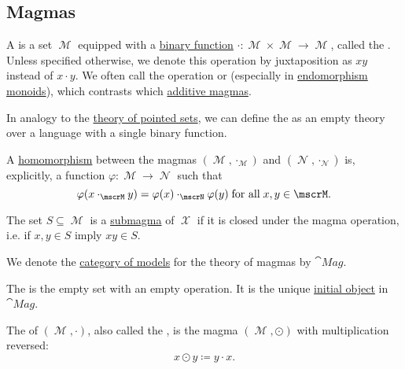 \subsection{Magmas}\label{subsec:magmas}

\begin{definition}\label{def:magma}
  A  is a set \( \mscrM \) equipped with a \hyperref[def:function/arity]{binary function} \( \cdot: \mscrM \times \mscrM \to \mscrM \), called the . Unless specified otherwise, we denote this operation by juxtaposition as \( xy \) instead of \( x \cdot y \). We often call the operation  or  (especially in \hyperref[def:endomorphism_monoid]{endomorphism monoids}), which contrasts which \hyperref[rem:additive_magma]{additive magmas}.

  \begin{thmenum}
     In analogy to the \hyperref[def:pointed_set/theory]{theory of pointed sets}, we can define the  as an empty theory over a language with a single binary function.

     A \hyperref[def:first_order_homomorphism]{homomorphism} between the magmas \( (\mscrM, \cdot_{\mscrM}) \) and \( (\mscrN, \cdot_{\mscrN}) \) is, explicitly, a function \( \varphi: \mscrM \to \mscrN \) such that
    \begin{equation}\label{eq:def:magma/homomorphism}
      \varphi(x \cdot_{\mscrM} y) = \varphi(x) \cdot_{\mscrN} \varphi(y) \T{for all} x, y \in \mscrM.
    \end{equation}

     The set \( S \subseteq \mscrM \) is a \hyperref[def:first_order_substructure]{submagma} of \( \mscrX \) if it is closed under the magma operation, i.e. if \( x, y \in S \) imply \( xy \in S \).

     We denote the \hyperref[def:category_of_first_order_models]{category of models} for the theory of magmas by \( \cat{Mag} \).

     The  is the empty set with an empty operation. It is the unique \hyperref[def:zero_objects/initial]{initial object} in \( \cat{Mag} \).

     The  of \( (\mscrM, \cdot) \), also called the , is the magma \( (\mscrM, \odot) \) with multiplication reversed:
    \begin{equation*}
      x \odot y \coloneqq y \cdot x.
    \end{equation*}


\end{thmenum}
\end{definition}
